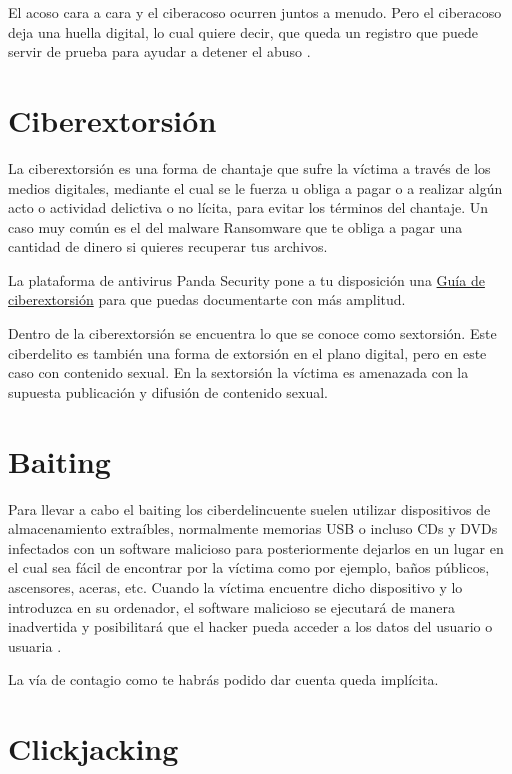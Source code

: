 \documentclass[
  spanish,
  a4paper,
  openany]{book}
\begin{document}
El acoso cara a cara y el ciberacoso ocurren juntos a menudo. Pero el ciberacoso deja una huella digital, lo cual quiere decir, que queda un registro que puede servir de prueba para ayudar a detener el abuso \citep{ciberacoso}.

\hypertarget{ciberextorsiuxf3n}{%
\section{Ciberextorsión}\label{ciberextorsiuxf3n}}

La ciberextorsión es una forma de chantaje que sufre la víctima a través de los medios digitales, mediante el cual se le fuerza u obliga a pagar o a realizar algún acto o actividad delictiva o no lícita, para evitar los términos del chantaje. Un caso muy común es el del malware Ransomware que te obliga a pagar una cantidad de dinero si quieres recuperar tus archivos.

La plataforma de antivirus Panda Security pone a tu disposición una \href{https://www.pandasecurity.com/es/mediacenter/src/uploads/2016/02/Guia_Ciberextorsion-es.pdf}{Guía de ciberextorsión} para que puedas documentarte con más amplitud.

Dentro de la ciberextorsión se encuentra lo que se conoce como sextorsión. Este ciberdelito es también una forma de extorsión en el plano digital, pero en este caso con contenido sexual. En la sextorsión la víctima es amenazada con la supuesta publicación y difusión de contenido sexual.

\hypertarget{baiting}{%
\section{Baiting}\label{baiting}}

Para llevar a cabo el baiting los ciberdelincuente suelen utilizar dispositivos de almacenamiento extraíbles, normalmente memorias USB o incluso CDs y DVDs infectados con un software malicioso para posteriormente dejarlos en un lugar en el cual sea fácil de encontrar por la víctima como por ejemplo, baños públicos, ascensores, aceras, etc. Cuando la víctima encuentre dicho dispositivo y lo introduzca en su ordenador, el software malicioso se ejecutará de manera inadvertida y posibilitará que el hacker pueda acceder a los datos del usuario o usuaria \citep{baiting}.

La vía de contagio como te habrás podido dar cuenta queda implícita.

\hypertarget{clickjacking}{%
\section{Clickjacking}\label{clickjacking}}
\end{document}
